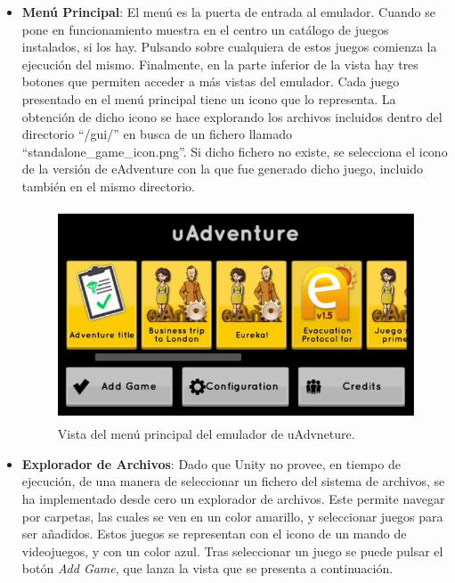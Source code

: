 \begin{itemize}
	\item \textbf{Menú Principal}: El menú es la puerta de entrada al emulador. Cuando se pone en funcionamiento muestra en el centro un catálogo de juegos instalados, si los hay. Pulsando sobre cualquiera de estos juegos comienza la ejecución del mismo. Finalmente, en la parte inferior de la vista hay tres botones que permiten acceder a más vistas del emulador. Cada juego presentado en el menú principal tiene un icono que lo representa. La obtención de dicho icono se hace explorando los archivos incluidos dentro del directorio ``/gui/'' en busca de un fichero llamado ``standalone\_game\_icon.png''. Si dicho fichero no existe, se selecciona el icono de la versión de eAdventure con la que fue generado dicho juego, incluido también en el mismo directorio.

\begin{figure}[h!]
	\centerline{\includegraphics[height=2.5in]{figures/it3/emu-main.png}}
	\caption[Menu Principal - Emulador]{Vista del menú principal del emulador de uAdvneture.}
	\label{emumainit3}
\end{figure}


	\item \textbf{Explorador de Archivos}: Dado que Unity no provee, en tiempo de ejecución, de una manera de seleccionar un fichero del sistema de archivos, se ha implementado desde cero un explorador de archivos. Este permite navegar por carpetas, las cuales se ven en un color amarillo, y seleccionar juegos para ser añadidos. Estos juegos se representan con el icono de un mando de videojuegos, y con un color azul. Tras seleccionar un juego se puede pulsar el botón \textit{Add Game}, que lanza la vista que se presenta a continuación.


\end{itemize}
